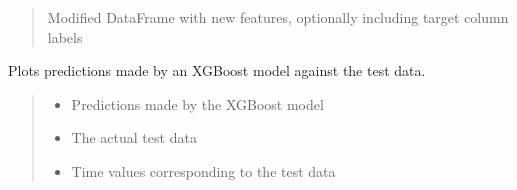 \documentclass[letterpaper,10pt,english]{sphinxmanual}
\begin{document}
\begin{fulllineitems}
\begin{fulllineitems}
\begin{quote}
\begin{description}
\begin{itemize}
\end{itemize}

\sphinxAtStartPar
Modified DataFrame with new features, optionally including target column labels

\end{description}\end{quote}

\end{fulllineitems}


\begin{fulllineitems}
\label{\detokenize{docs/XGB_model:XGB_model.XGB_Predictor.plot_predictions}}
\pysigstartsignatures
{}
\pysigstopsignatures
\sphinxAtStartPar
Plots predictions made by an XGBoost model against the test data.
\begin{quote}\begin{description}
\begin{itemize}
\item {} 
\sphinxAtStartPar
{} \textendash{} Predictions made by the XGBoost model

\item {} 
\sphinxAtStartPar
{} \textendash{} The actual test data

\item {} 
\sphinxAtStartPar
{} \textendash{} Time values corresponding to the test data

\end{itemize}

\end{description}\end{quote}

\end{fulllineitems}



\end{fulllineitems}
\end{document}
